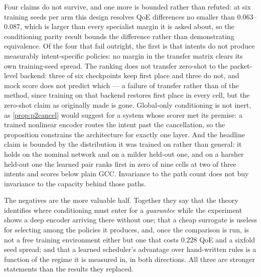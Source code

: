 Four claims do not survive, and one more is bounded rather than refuted: at six training seeds per arm
this design resolves QoE differences no smaller than \SIrange{0.063}{0.087}{}, which is larger than
every specialist margin it is asked about, so the conditioning parity result bounds the difference
rather than demonstrating equivalence. Of the four that fail outright, the first is that intents do not
produce measurably intent-specific policies: no margin in
the transfer matrix clears its own training-seed spread. The ranking does not transfer zero-shot to the
packet-level backend: three of six checkpoints keep first place and three do not, and mock score does
not predict which --- a failure of transfer rather than of the method, since training on that backend
restores first place in every cell, but the zero-shot claim as originally made is gone. Global-only
conditioning is not inert, as \cref{prop:p2cancel} would suggest for
a system whose scorer met its premise: a trained nonlinear encoder routes the intent past the
cancellation, so the proposition constrains the architecture for exactly one layer. And the headline
claim is bounded by the distribution it was trained on rather than general: it holds on the nominal
network and on a milder held-out one, and on a harsher held-out one the learned pair ranks first in zero
of nine cells at two of three intents and scores below plain GCC. Invariance to the path count does not
buy invariance to the capacity behind those paths.

The negatives are the more valuable half. Together they say that the theory identifies where
conditioning must enter for a \emph{guarantee} while the experiment shows a deep encoder arriving there
without one; that a cheap surrogate is useless for selecting among the policies it produces, and, once
the comparison is run, is not a free training environment either but one that costs $0.228$ QoE and a
sixfold seed spread; and that a learned scheduler's advantage over hand-written rules is a function of
the regime it is measured in, in both directions. All three are stronger statements than the results
they replaced.
